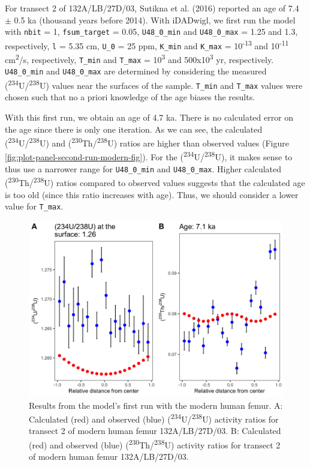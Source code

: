 \documentclass[]{elsarticle} %
\begin{document}
For transect 2 of 132A/LB/27D/03, Sutikna et al. (2016) reported an age of 7.4 \(\pm\) 0.5 ka (thousand years before 2014). With iDADwigl, we first run the model with \texttt{nbit} = 1, \texttt{fsum\_target} = 0.05, \texttt{U48\_0\_min} and \texttt{U48\_0\_max} = 1.25 and 1.3, respectively, \texttt{l} = 5.35 cm, \texttt{U\_0} = 25 ppm, \texttt{K\_min} and \texttt{K\_max} = 10\textsuperscript{-13} and 10\textsuperscript{-11} cm\textsuperscript{2}/s, respectively, \texttt{T\_min} and \texttt{T\_max} = 10\textsuperscript{3} and 500x10\textsuperscript{3} yr, respectively. \texttt{U48\_0\_min} and \texttt{U48\_0\_max} are determined by considering the measured (\textsuperscript{234}U/\textsuperscript{238}U) values near the surfaces of the sample. \texttt{T\_min} and \texttt{T\_max} values were chosen such that no a priori knowledge of the age biases the results.

With this first run, we obtain an age of 4.7 ka. There is no calculated error on the age since there is only one iteration. As we can see, the calculated (\textsuperscript{234}U/\textsuperscript{238}U) and (\textsuperscript{230}Th/\textsuperscript{238}U) ratios are higher than observed values (Figure \ref{fig:plot-panel-second-run-modern-fig}). For the (\textsuperscript{234}U/\textsuperscript{238}U), it makes sense to thus use a narrower range for \texttt{U48\_0\_min} and \texttt{U48\_0\_max}. Higher calculated (\textsuperscript{230}Th/\textsuperscript{238}U) ratios compared to observed values suggests that the calculated age is too old (since this ratio increases with age). Thus, we should consider a lower value for \texttt{T\_max}.



\begin{figure}
\includegraphics[width=0.95\linewidth]{figures/plot-panel-first-run-modern} \caption{Results from the model's first run with the modern human femur. A: Calculated (red) and observed (blue) (\textsuperscript{234}U/\textsuperscript{238}U) activity ratios for transect 2 of modern human femur 132A/LB/27D/03. B: Calculated (red) and observed (blue) (\textsuperscript{230}Th/\textsuperscript{238}U) activity ratios for transect 2 of modern human femur 132A/LB/27D/03.}\label{fig:plot-panel-first-run-modern-fig}
\end{figure}
\end{document}
